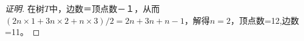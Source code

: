 \begin{proof}[证明]
  在树$T$中，边数＝顶点数－１，从而$(2n\times 1 + 3n \times 2 + n \times 3)/2 = 2n + 3n + n - 1$，解得$n=2$，顶点数=12,边数=11。
\end{proof}
